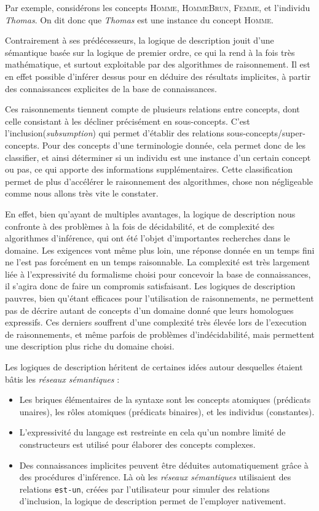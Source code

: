 \begin{exemple}
  Par exemple, considérons les concepts \textsc{Homme}, \textsc{HommeBrun}, \textsc{Femme}, et l'individu \emph{Thomas}. On dit donc que \emph{Thomas} est une instance du concept \textsc{Homme}.
\end{exemple}
\par Contrairement à ses prédécesseurs, la logique de description jouit d'une sémantique basée sur la logique de premier ordre, ce qui la rend à la fois très mathématique, et surtout exploitable par des algorithmes de raisonnement. Il est en effet possible d'inférer dessus pour en déduire des résultats implicites, à partir des connaissances explicites de la base de connaissances.
\par Ces raisonnements tiennent compte de plusieurs relations entre concepts, dont celle consistant à les décliner précisément en sous-concepts. C'est l'inclusion(\emph{subsumption}) qui permet d'établir des relations sous-concepts/super-concepts. Pour des concepts d'une terminologie donnée, cela permet donc de les classifier, et ainsi déterminer si un individu est une instance d'un certain concept ou pas, ce qui apporte des informations supplémentaires. Cette classification permet de plus d'accélérer le raisonnement des algorithmes, chose non négligeable comme nous allons très vite le constater.
\par En effet, bien qu'ayant de multiples avantages, la logique de description nous confronte à des problèmes à la fois de décidabilité, et de complexité des algorithmes d'inférence, qui ont été l'objet d'importantes recherches dans le domaine. Les exigences vont même plus loin, une réponse donnée en un temps fini ne l'est pas forcément en un temps raisonnable. La complexité est très largement liée à l'expressivité du formalisme choisi pour concevoir la base de connaissances, il s'agira donc de faire un compromis satisfaisant. Les logiques de description pauvres, bien qu'étant efficaces pour l'utilisation de raisonnements, ne permettent pas de décrire autant de concepts d'un domaine donné que leurs homologues expressifs. Ces derniers souffrent d'une complexité très élevée lors de l'execution de raisonnements, et même parfois de problèmes d'indécidabilité, mais permettent une description plus riche du domaine choisi.
\par Les logiques de description héritent de certaines idées autour desquelles étaient bâtis les \emph{réseaux sémantiques} :
\begin{itemize}
\item Les briques élémentaires de la syntaxe sont les concepts atomiques (prédicats unaires), les rôles atomiques (prédicats binaires), et les individus (constantes).
\item L'expressivité du langage est restreinte en cela qu'un nombre limité de constructeurs est utilisé pour élaborer des concepts complexes.
\item Des connaissances implicites peuvent être déduites automatiquement grâce à des procédures d'inférence. Là où les \emph{réseaux sémantiques} utilisaient des relations \texttt{est-un}, créées par l'utilisateur pour simuler des relations d'inclusion, la logique de description permet de l'employer nativement.
\end{itemize}
